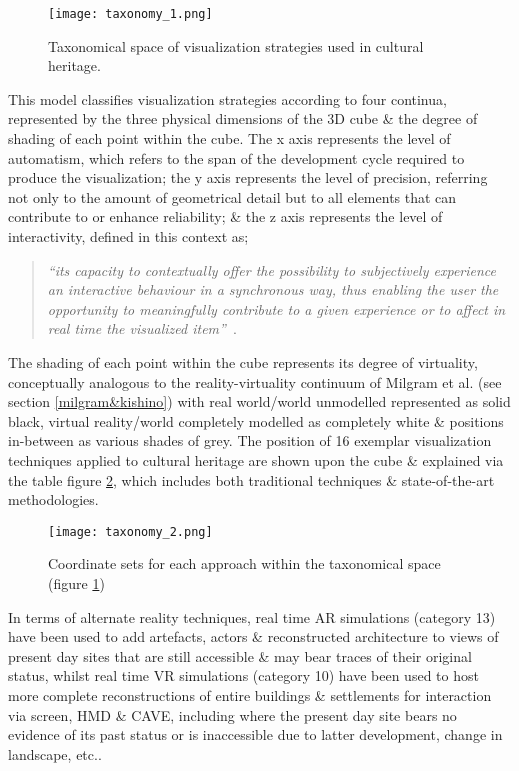 \begin{figure}[h]
\centering
  \texttt{[image: taxonomy\_1.png]}
  \caption{Taxonomical space of visualization strategies used in cultural heritage.}
  \label{taxonomy_1.png}
\end{figure}

This model classifies visualization strategies according to four continua, represented by the three physical dimensions of the 3D cube \& the degree of shading of each point within the cube. The x axis represents the level of automatism, which refers to the span of the development cycle required to produce the visualization; the y axis represents the level of precision, referring not only to the amount of geometrical detail but to all elements that can contribute to or enhance reliability; \& the z axis represents the level of interactivity, defined in this context as;

\begin{quote}
	\textit{``its capacity to contextually offer the possibility to subjectively experience an interactive behaviour in a synchronous way, thus enabling the user the opportunity to meaningfully contribute to a given experience or to affect in real time the visualized  item''}~\cite{Foni2010}.
\end{quote}

The shading of each point within the cube represents its degree of virtuality, conceptually analogous to the reality-virtuality continuum of Milgram et al. (see section \ref{milgram&kishino}) with real world/world unmodelled represented as solid black, virtual reality/world completely modelled as completely white \& positions in-between as various shades of grey. The position of 16 exemplar visualization techniques applied to cultural heritage are shown upon the cube \& explained via the table figure \ref{taxonomy_2.png}, which includes both traditional techniques \& state-of-the-art methodologies.

\begin{figure}[h]
\centering
  \texttt{[image: taxonomy\_2.png]}
  \caption{Coordinate sets for each approach within the taxonomical space (figure \ref{taxonomy_1.png})}
  \label{taxonomy_2.png}
\end{figure}


In terms of alternate reality techniques, real time AR simulations (category 13) have been used to add artefacts, actors \& reconstructed architecture to views of present day sites that are still accessible \& may bear traces of their original status, whilst real time VR simulations (category 10) have been used to host more complete reconstructions of entire buildings \& settlements for interaction via screen, HMD \& CAVE, including where the present day site bears no evidence of its past status or is inaccessible due to latter development, change in landscape, etc..

